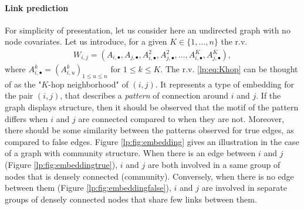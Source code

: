 \documentclass[a4paper, 11pt]{article}
\theoremstyle{remark}
\begin{document}
\paragraph{Link prediction}%

For simplicity of presentation, let us consider here an undirected graph with no node covariates. Let us introduce, for a given $K \in \{1, \dots, n \}$ the r.v.
\begin{align} \label{lp:eq:Khop}
W_{i,j} = (A_{i, \bullet}, A_{j, \bullet}, A^2_{i, \bullet}, A^2_{j, \bullet}, \dots, A^K_{i, \bullet}, A^K_{j, \bullet}), 
\end{align}
where $A^k_{i, \bullet} = (A^k_{i, u})_{1\leq u \leq n}$ for $1 \leq k \leq K$.
The r.v. \eqref{lp:eq:Khop} can be thought of as the "$K$-hop neighborhood" of $(i,j)$. It represents a type of embedding for the pair $(i,j)$, that describes a \textit{pattern} of connection around $i$ and $j$. If the graph displays structure, then it should be observed that the motif of the pattern differs when $i$ and $j$ are connected compared to when they are not. Moreover, there should be some similarity between the patterns observed for true edges, as compared to false edges. Figure \ref{lp:fig:embedding} gives an illustration in the case of a graph with community structure. When there is an edge between $i$ and $j$ (Figure \ref{lp:fig:embeddingtrue}), $i$ and $j$ are both involved in a same group of nodes that is densely connected (community). Conversely, when there is no edge between them (Figure \ref{lp:fig:embeddingfalse}), $i$ and $j$ are involved in separate groups of densely connected nodes that share few links between them. 
\end{document}
